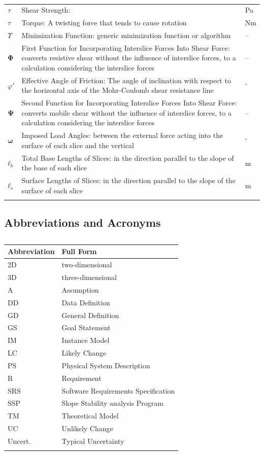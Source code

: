 \documentclass[12pt]{article}
\begin{document}
\begin{longtabu}{l X[l] l}
\\
$τ$ & Shear Strength:  & Pa
\\
$τ$ & Torque: A twisting force that tends to cause rotation & Nm
\\
$Υ$ & Minimization Function: generic minimization function or algorithm & --
\\
$\mathbf{Φ}$ & First Function for Incorporating Interslice Forces Into Shear Force: converts resistive shear without the influence of interslice forces, to a calculation considering the interslice forces & --
\\
$φ'$ & Effective Angle of Friction: The angle of inclination with respect to the horizontal axis of the Mohr-Coulomb shear resistance line & ${}^{\circ}$
\\
$\mathbf{Ψ}$ & Second Function for Incorporating Interslice Forces Into Shear Force: converts mobile shear without the influence of interslice forces, to a calculation considering the interslice forces & --
\\
$\mathbf{ω}$ & Imposed Load Angles: between the external force acting into the surface of each slice and the vertical & ${}^{\circ}$
\\
${\mathbf{ℓ}_{b}}$ & Total Base Lengths of Slices: in the direction parallel to the slope of the base of each slice & m
\\
${\mathbf{ℓ}_{s}}$ & Surface Lengths of Slices: in the direction parallel to the slope of the surface of each slice & m
\\
\bottomrule
\caption{}
\label{Table:ToS}
\end{longtabu}
\subsection{Abbreviations and Acronyms}
\label{Sec:TAbbAcc}
\begin{longtable}{l l}
\toprule
Abbreviation & Full Form
\\
\midrule
\endhead
2D & two-dimensional
\\
3D & three-dimensional
\\
A & Assumption
\\
DD & Data Definition
\\
GD & General Definition
\\
GS & Goal Statement
\\
IM & Instance Model
\\
LC & Likely Change
\\
PS & Physical System Description
\\
R & Requirement
\\
SRS & Software Requirements Specification
\\
SSP & Slope Stability analysis Program
\\
TM & Theoretical Model
\\
UC & Unlikely Change
\\
Uncert. & Typical Uncertainty
\\
\bottomrule
\caption{}
\label{Table:TAbbAcc}
\end{longtable}
\end{document}
